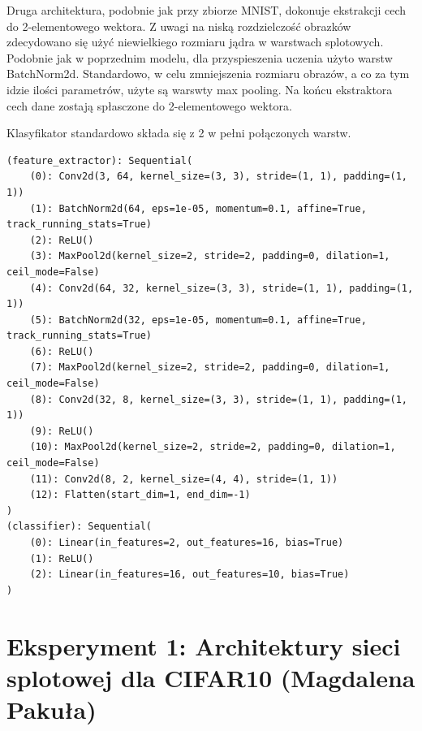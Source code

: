 \documentclass[10pt]{article}
\begin{document}
Druga architektura, podobnie jak przy zbiorze MNIST, dokonuje ekstrakcji cech do 2-elementowego wektora.
Z uwagi na niską rozdzielczość obrazków zdecydowano się użyć niewielkiego rozmiaru jądra w warstwach splotowych.
Podobnie jak w poprzednim modelu, dla przyspieszenia uczenia użyto warstw BatchNorm2d.
Standardowo, w celu zmniejszenia rozmiaru obrazów, a co za tym idzie ilości parametrów, użyte są warswty max pooling.
Na końcu ekstraktora cech dane zostają spłasczone do 2-elementowego wektora.

Klasyfikator standardowo składa się z 2 w pełni połączonych warstw.

\tiny
\begin{verbatim}
(feature_extractor): Sequential(
    (0): Conv2d(3, 64, kernel_size=(3, 3), stride=(1, 1), padding=(1, 1))
    (1): BatchNorm2d(64, eps=1e-05, momentum=0.1, affine=True, track_running_stats=True)
    (2): ReLU()
    (3): MaxPool2d(kernel_size=2, stride=2, padding=0, dilation=1, ceil_mode=False)
    (4): Conv2d(64, 32, kernel_size=(3, 3), stride=(1, 1), padding=(1, 1))
    (5): BatchNorm2d(32, eps=1e-05, momentum=0.1, affine=True, track_running_stats=True)
    (6): ReLU()
    (7): MaxPool2d(kernel_size=2, stride=2, padding=0, dilation=1, ceil_mode=False)
    (8): Conv2d(32, 8, kernel_size=(3, 3), stride=(1, 1), padding=(1, 1))
    (9): ReLU()
    (10): MaxPool2d(kernel_size=2, stride=2, padding=0, dilation=1, ceil_mode=False)
    (11): Conv2d(8, 2, kernel_size=(4, 4), stride=(1, 1))
    (12): Flatten(start_dim=1, end_dim=-1)
)
(classifier): Sequential(
    (0): Linear(in_features=2, out_features=16, bias=True)
    (1): ReLU()
    (2): Linear(in_features=16, out_features=10, bias=True)
)
\end{verbatim}
\normalsize

\pagebreak
\section{Eksperyment 1: Architektury sieci splotowej dla CIFAR10 (Magdalena Pakuła)}\label{sec:ex1-pakula_cifar}
\end{document}
